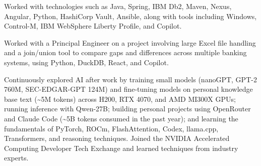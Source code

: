 \begin{cventries}
{\begin{cvitems}
        \item {Worked with technologies such as Java, Spring, IBM Db2, Maven, Nexus, Angular, Python, HashiCorp Vault, Ansible, along with tools including Windows, Control-M, IBM WebSphere Liberty Profile, and Copilot.}
        \item {Worked with a Principal Engineer on a project involving large Excel file handling and a join/union tool to compare gaps and differences across multiple banking systems, using Python, DuckDB, React, and Copilot.}
        \item {Continuously explored AI after work by training small models (nanoGPT, GPT-2 760M, SEC-EDGAR-GPT 124M) and fine-tuning models on personal knowledge base text (\textasciitilde5M tokens) across H200, RTX 4070, and AMD MI300X GPUs; running inference with Qwen-27B; building personal projects using OpenRouter and Claude Code (\textasciitilde5B tokens consumed in the past year); and learning the fundamentals of PyTorch, ROCm, FlashAttention, Codex, llama.cpp, Transformers, and reasoning techniques. Joined the NVIDIA Accelerated Computing Developer Tech Exchange and learned techniques from industry experts.}
      \end{cvitems}
    }


\end{cventries}
